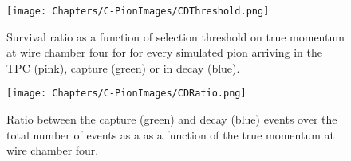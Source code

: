\begin{figure}[h!]
\centering
\begin{minipage}[t]{0.45\textwidth}
\centering
\texttt{[image: Chapters/C-PionImages/CDThreshold.png]}
\caption{Survival ratio as a function of selection threshold on true momentum at wire chamber four for for every simulated pion arriving in the TPC (pink), capture (green) or in decay (blue).   }
\label{fig:survRatio}
\end{minipage}\hfill
\begin{minipage}[t]{0.45\textwidth}
\centering
\texttt{[image: Chapters/C-PionImages/CDRatio.png]}
\caption{Ratio between the capture (green) and decay (blue) events over the total number of events as a as a function of the true momentum at wire chamber four.}
\label{fig:evtRatio}
\end{minipage}
\end{figure}













